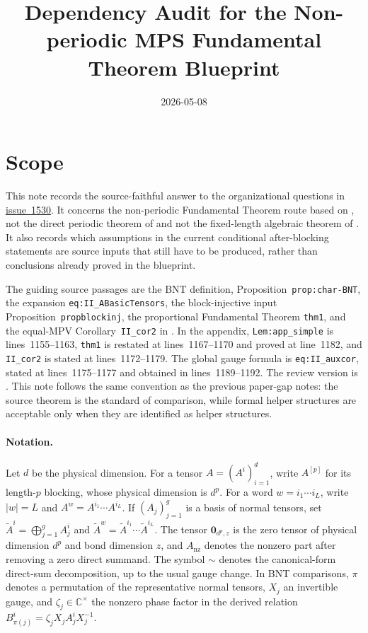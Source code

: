 \documentclass{article}
\title{Dependency Audit for the Non-periodic MPS Fundamental Theorem Blueprint}
\author{}
\date{2026-05-08}
\begin{document}
\maketitle

\section{Scope}

This note records the source-faithful answer to the organizational questions in
\href{https://github.com/LionSR/TNLean/issues/1530}{issue~1530}. It concerns
the non-periodic Fundamental Theorem route based on
\cite{Cirac2016MPDO_arXiv,Cirac2021Matrix}, not the direct periodic theorem of
\cite{DeLasCuevas2017Irreducible} and not the fixed-length algebraic theorem of
\cite{Molnar2018NormalPEPS}. It also records which assumptions in the current
conditional after-blocking statements are source inputs that still have to be
produced, rather than conclusions already proved in the blueprint.

The guiding source passages are the BNT definition, Proposition~\texttt{prop:char-BNT},
the expansion \texttt{eq:II\_ABasicTensors}, the block-injective input
Proposition~\texttt{propblockinj}, the proportional Fundamental Theorem
\texttt{thm1}, and the equal-MPV Corollary~\texttt{II\_cor2} in
\cite[lines~271--356]{Cirac2016MPDO_arXiv}. In the appendix,
\texttt{Lem:app\_simple} is lines~1155--1163, \texttt{thm1} is restated at
lines~1167--1170 and proved at line~1182, and \texttt{II\_cor2} is stated at
lines~1172--1179. The global gauge formula is \texttt{eq:II\_auxcor}, stated
at lines~1175--1177 and obtained in lines~1189--1192. The review version is
\cite[Section~IV]{Cirac2021Matrix}. This note follows the same convention as
the previous paper-gap notes: the source theorem is the standard of comparison,
while formal helper structures are acceptable only when they are identified as
helper structures.

\paragraph{Notation.}
Let $d$ be the physical dimension. For a tensor $A=(A^i)_{i=1}^d$, write
$A^{[p]}$ for its length-$p$ blocking, whose physical dimension is $d^p$. For a
word $w=i_1\cdots i_L$, write $|w|=L$ and $A^w=A^{i_1}\cdots A^{i_L}$. If
$(A_j)_{j=1}^g$ is a basis of normal tensors, set
$\tilde A^i=\bigoplus_{j=1}^g A_j^i$ and
$\tilde A^w=\tilde A^{i_1}\cdots\tilde A^{i_L}$. The tensor
$\mathbf{0}_{d^p,z}$ is the zero tensor of physical dimension $d^p$ and bond
dimension $z$, and $A_{\mathrm{nz}}$ denotes the nonzero part after removing a
zero direct summand. The symbol $\sim$ denotes the canonical-form direct-sum
decomposition, up to the usual gauge change. In BNT comparisons, $\pi$ denotes
a permutation of the representative normal tensors, $X_j$ an invertible gauge,
and $\zeta_j\in\mathbb C^\times$ the nonzero phase factor in the derived
relation $B_{\pi(j)}^i=\zeta_j X_j A_j^i X_j^{-1}$.
\end{document}
